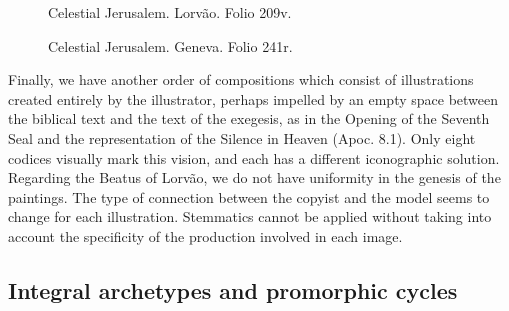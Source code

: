 \begin{paper}
\begin{figure}[H]
  \begin{minipage}[b]{0.45\textwidth}
    \centering
    \caption{Celestial Jerusalem. Lorvão. Folio 209v.}
    \label{fig:rocha:celestial-lorvao}
\end{minipage}
\hfill
  \begin{minipage}[b]{0.475\textwidth}
    \centering
    \caption{Celestial Jerusalem. Geneva. Folio 241r.\protect\footnotemark}
    \label{fig:rocha:celestial-geneva}
    \end{minipage}
\end{figure}

Finally, we have another order of compositions which consist of
illustrations created entirely by the illustrator, perhaps impelled by
an empty space between the biblical text and the text of the exegesis,
as in the Opening of the Seventh Seal and the representation of the
Silence in Heaven (Apoc. 8.1). Only eight codices visually mark this
vision, and each has a different iconographic solution. Regarding the
Beatus of Lorvão, we do not have uniformity in the genesis of the
paintings. The type of connection between the copyist and the model
seems to change for each illustration. Stemmatics cannot be applied
without taking into account the specificity of the production involved
in each image.

\subsection*{Integral archetypes and promorphic cycles}


\end{paper}
